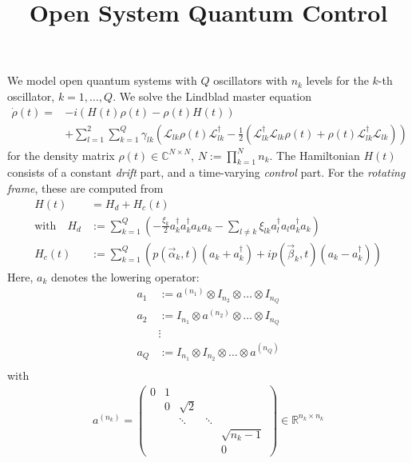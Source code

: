 \documentclass[letterpaper]{article}
\title{Open System Quantum Control}
\newcommand{\Ell}{\mathcal{L}}
\newcommand{\R}{\mathds{R}}
\newcommand{\C}{\mathds{C}}
\begin{document}
\maketitle


We model open quantum systems with $Q$ oscillators with $n_k$ levels for the $k$-th oscillator, $k=1,\dots,Q$. We solve the Lindblad master equation
\begin{align}\label{mastereq}
  \dot \rho(t) = &-i(H(t)\rho(t) - \rho(t)H(t)) \\
          &+ \sum_{l=1}^2 \sum_{k=1}^Q \gamma_{lk} \left( \Ell_{lk} \rho(t) \Ell_{lk}^{\dagger} - \frac 1 2 \left( \Ell_{lk}^{\dagger}\Ell_{lk} \rho(t) + \rho(t)\Ell_{lk}^{\dagger} \Ell_{lk}\right) \right)
\end{align}
for the density matrix $\rho(t)\in \C^{N\times N}$, $N := \prod_{k=1}^N n_k$. The Hamiltonian $H(t)$ consists of a constant \textit{drift} part, and a time-varying \textit{control} part. For the \textit{rotating frame}, these are computed from
\begin{align}
  H(t) &= H_d + H_c(t) \\
  \text{with} \quad H_d &:= \sum_{k=1}^Q \left(- \frac{\xi_k}{2} a_k^{\dagger}a_k^{\dagger}a_k a_k - \sum_{l\neq k} \xi_{lk} a_l^{\dagger}a_l a_k^{\dagger} a_k  \right) \\
                 H_c(t) &:= \sum_{k=1}^Q \left( p(\vec{\alpha}_k,t) (a_k + a_k^{\dagger}) + i p(\vec{\beta}_k,t)(a_k - a_k^{\dagger})  \right)
\end{align}
Here, $a_k$ denotes the lowering operator:
\begin{align}
  a_1 &:= a^{(n_1)} \otimes I_{n_2} \otimes \dots \otimes I_{n_Q}\\
  a_2 &:= I_{n_1} \otimes a^{(n_2)} \otimes \dots \otimes I_{n_Q}\\
  &\vdots \\
  a_Q &:= I_{n_1} \otimes I_{n_2} \otimes \dots \otimes a^{(n_Q)}\\
\end{align}
with 
\begin{align}
 a^{(n_k)} = \begin{pmatrix}
   0 & 1 &          &         &    \\
     & 0 & \sqrt{2} &         &     \\
     &   & \ddots   & \ddots  &    \\
     &   &          &         & \sqrt{n_k-1}  \\
     &   &          &         & 0   
 \end{pmatrix} \in \R^{n_k \times n_k}
\end{align}
\end{document}

